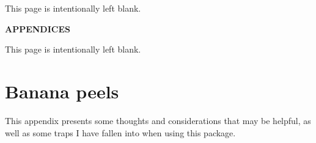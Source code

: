 \documentclass[12pt]{article}
\newcommand{\pstyle}{myheadings}
\newcommand{\pb}{\strut \vfill \pagebreak}
\newcommand{\bpage}{\vfill \pagebreak \strut

\vspace{2.5in} \centerline{This page is intentionally left blank.}}
\newcommand{\bpagea}{\strut

\vspace{2.5in} \centerline{This page is intentionally left blank.}}
\newcommand{\newsec}{\setcounter{equation}{0}
                      \setcounter{myfigno}{0}
                      \setcounter{mytabno}{0}}
\newcounter{myfigno}[section]
\newcounter{mytabno}[section]
\begin{document}
\pb
\setcounter{footnote}{0}


%


\pb
\pagestyle{empty}
\bpagea

\pb \strut
\pagestyle{empty}


\vspace{2.5in} \centerline{\large \bf APPENDICES}
\appendix
{}

\bpage
\pb \newsec \setcounter{page}{1} \pagestyle{\pstyle}
\renewcommand{\thepage}{\thesection.\arabic{page}}
\section{Banana peels} \label{app:hints}

\noindent
This appendix presents some thoughts and considerations that may be helpful,
as well as some traps I have fallen into when using this package. 
\end{document}
